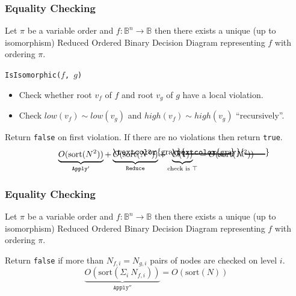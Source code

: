 \documentclass[english, aspectratio=169]{beamer}
\newcommand\hcancel[2][black]{\setbox0=\hbox{$#2$}%
  \rlap{\raisebox{.35\ht0}{\textcolor{#1}{\rule{\wd0}{1pt}}}}#2}
\newcommand{\B}[0]{\ensuremath{\mathbb{B}}}
\newcommand{\sort}[0]{\text{sort}}
\begin{document}
\begin{frame}[t]
  \frametitle{Equality Checking}

  \begin{theorem}[Bryant '86]
    Let $\pi$ be a variable order and $f : \B^n \rightarrow \B$ then there
    exists a unique (up to isomorphism) Reduced Ordered Binary Decision
    Diagram representing $f$ with ordering $\pi$.
  \end{theorem}

  \texttt{IsIsomorphic($f$, $g$)}
  \begin{itemize}
  \item Check whether root $v_f$ of $f$ and root $v_g$ of $g$ have a local violation.
  \item Check $\mathit{low}(v_f) \sim \mathit{low}(v_g)$ and $\mathit{high}(v_f)
    \sim \mathit{high}(v_g)$ ``recursively''.
  \end{itemize}
  Return \texttt{false} on first violation. If there are no violations then return \texttt{true}.
  \pause
  \begin{equation*}
    \underbrace{O(\sort(N^2))}_{\texttt{Apply}'}
    + \underbrace{\hcancel[gray]{O(\sort(N^2))}}_{\texttt{Reduce}}
    + \underbrace{\hcancel[gray]{O(1))}}_{\text{check is } \top}
    =
    O(\sort(N^2))
  \end{equation*}
\end{frame}

\begin{frame}[t]
  \frametitle{Equality Checking}

  \begin{theorem}[Bryant '86]
    Let $\pi$ be a variable order and $f : \B^n \rightarrow \B$ then there
    exists a unique (up to isomorphism) Reduced Ordered Binary Decision
    Diagram representing $f$ with ordering $\pi$.
  \end{theorem}

  \vspace{-10pt}
  \begin{figure}
    \centering

    \begin{tikzpicture}[scale=0.9, every node/.style={transform shape}]
      
    \end{tikzpicture}
  \end{figure}
  \pause
  \vspace{-20pt}
  Return \texttt{false} if more than $N_{f,i} = N_{g,i}$ pairs of nodes are checked on level $i$.
  \begin{equation*}
    \underbrace{O (\sort (\Sigma_{i}\ N_{f,i} ) )}_{\texttt{Apply}''}
    =
    O(\sort(N))
  \end{equation*}
\end{frame}
\end{document}
